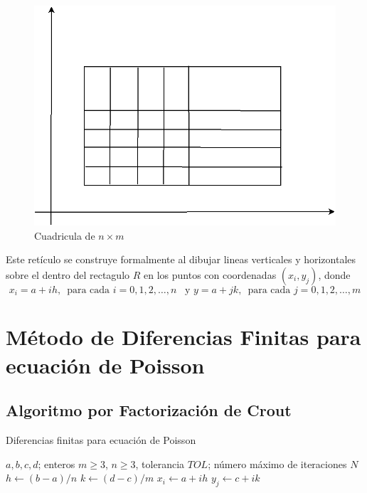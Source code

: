 \documentclass[a4paper]{article}
\begin{document}
\begin{figure}[h]
\begin{center}
\includegraphics[scale=0.29]{./lattice.png} 
\end{center} 
\caption{Cuadricula de $n\times m$}
\label{fig::fig1}
\end{figure}
Este retículo se construye formalmente al dibujar lineas verticales y horizontales sobre el dentro del rectagulo $R$ en los puntos con coordenadas $(x_i, y_j)$, donde
\begin{equation}
x_i=a+ih,\,\,\,\text{para cada }i=0,1,2,\hdots,n\,\,\, \text{ y } y=a+jk,\,\,\,\text{para cada }j=0,1,2,\hdots,m
\end{equation}


\section{Método de Diferencias Finitas para ecuación de Poisson}
\subsection{Algoritmo por Factorización de Crout}
\begin{algorithm}
\caption{Diferencias finitas para ecuación de Poisson}
\begin{algorithmic}
\REQUIRE $a,b,c,d$; enteros $m\geq 3$, $n\geq 3$, tolerancia $TOL$; número máximo de iteraciones $N$
\STATE $h\leftarrow (b-a)/n$
\STATE $k\leftarrow (d-c)/m$
\STATE $x_i\leftarrow a+ih$ 
\ENDFOR
{} 
\STATE $y_j\leftarrow c+ik$ 
\ENDFOR


\end{algorithmic}
\end{algorithm}
\end{document}

